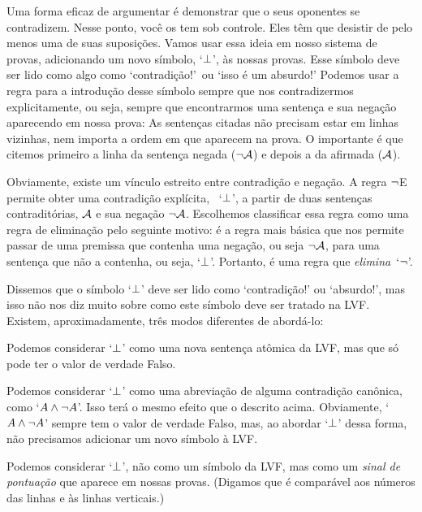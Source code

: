Uma forma eficaz de argumentar é demonstrar que o seus oponentes se contradizem. Nesse ponto, você os tem sob controle. Eles têm que desistir de pelo menos uma de suas suposições. Vamos usar essa ideia em nosso sistema de provas, adicionando um novo símbolo, `$\bot$', às nossas provas. Esse símbolo deve ser lido como algo como `contradição!'\ ou `isso é um absurdo!'  Podemos usar   a regra para a introdução desse símbolo sempre que nos contradizermos explicitamente, ou seja, sempre que encontrarmos uma sentença e sua negação aparecendo em nossa prova:
As sentenças citadas não precisam estar em linhas vizinhas, nem importa a ordem em que aparecem na prova. O importante é que citemos primeiro a linha da sentença negada ($\neg\mathcal{A}$) e depois a da afirmada ($\mathcal{A}$). 


Obviamente, existe um vínculo estreito entre contradição e negação. 
A regra $\neg$E permite obter uma contradição explícita, ~`$\bot$',  
 a partir de duas sentenças contraditórias, $\mathcal{A}$ e sua negação $\neg \mathcal{A}$. 
Escolhemos classificar essa regra como uma regra de eliminação pelo seguinte motivo: é a regra mais básica que nos permite passar de uma premissa que contenha uma negação, ou seja $\neg\mathcal{A}$, 
para uma sentença que não a contenha, ou seja,  `$\bot$'.  Portanto, é uma regra que \emph{elimina}~`$\neg$'.

Dissemos que o símbolo  `$\bot$'  deve ser lido como ‘contradição!’ ou `absurdo!', mas isso não nos diz muito sobre como este símbolo deve ser tratado na LVF. Existem, aproximadamente, três modos diferentes de abordá-lo:

	\begin{ebullet}
		\item Podemos considerar `$\bot$' como uma nova sentença atômica da LVF, mas que só pode ter o valor de verdade Falso.  
		\item Podemos considerar  `$\bot$' como uma abreviação de alguma contradição canônica, como `$A \wedge \neg A$'. Isso terá o mesmo efeito que o descrito acima. Obviamente, `$A \wedge \neg A$' sempre tem o valor de verdade Falso, mas, ao abordar `$\bot$' dessa forma, não precisamos adicionar um novo símbolo à LVF.
		\item Podemos considerar `$\bot$', não como um símbolo da LVF, mas como um \emph{sinal de pontuação} que aparece em nossas provas.  (Digamos que é comparável aos números das linhas e às linhas verticais.)
			\end{ebullet}
			
